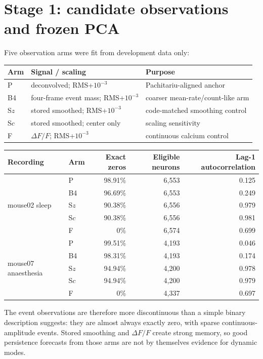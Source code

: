 \documentclass[11pt,a4paper]{article}
\begin{document}
\section{Stage 1: candidate observations and frozen PCA}

Five observation arms were fit from development data only:

\begin{center}
\begin{tabular}{@{}llP{0.48\textwidth}@{}}
\toprule
Arm & Signal / scaling & Purpose\\
\midrule
P & deconvolved; RMS+$10^{-3}$ & Pachitariu-aligned anchor\\
B4 & four-frame event mass; RMS+$10^{-3}$ & coarser mean-rate/count-like arm\\
S$z$ & stored smoothed; RMS+$10^{-3}$ & code-matched smoothing control\\
S$c$ & stored smoothed; center only & scaling sensitivity\\
F & $\Delta F/F$; RMS+$10^{-3}$ & continuous calcium control\\
\bottomrule
\end{tabular}
\end{center}

\begin{center}
\begin{tabular}{@{}llrrr@{}}
\toprule
Recording & Arm & Exact zeros & Eligible neurons & Lag-1 autocorrelation\\
\midrule
\multirow{5}{*}{mouse02 sleep}
& P  & 98.91\% & 6,553 & 0.125\\
& B4 & 96.69\% & 6,553 & 0.249\\
& S$z$ & 90.38\% & 6,556 & 0.979\\
& S$c$ & 90.38\% & 6,556 & 0.981\\
& F  & 0\% & 6,574 & 0.699\\
\midrule
\multirow{5}{*}{mouse07 anaesthesia}
& P  & 99.51\% & 4,193 & 0.046\\
& B4 & 98.31\% & 4,193 & 0.174\\
& S$z$ & 94.94\% & 4,200 & 0.978\\
& S$c$ & 94.94\% & 4,200 & 0.979\\
& F  & 0\% & 4,337 & 0.697\\
\bottomrule
\end{tabular}
\end{center}

The event observations are therefore more discontinuous than a simple binary
description suggests: they are almost always exactly zero, with sparse
continuous-amplitude events. Stored smoothing and $\Delta F/F$ create strong
memory, so good persistence forecasts from those arms are not by themselves
evidence for dynamic modes.
\end{document}
